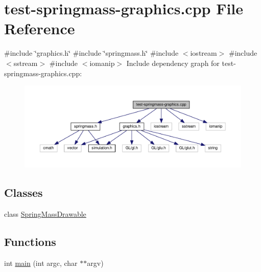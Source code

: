 \hypertarget{test-springmass-graphics_8cpp}{}\section{test-\/springmass-\/graphics.cpp File Reference}
\label{test-springmass-graphics_8cpp}
{\ttfamily \#include \char`\"{}graphics.\+h\char`\"{}}\newline
{\ttfamily \#include \char`\"{}springmass.\+h\char`\"{}}\newline
{\ttfamily \#include $<$iostream$>$}\newline
{\ttfamily \#include $<$sstream$>$}\newline
{\ttfamily \#include $<$iomanip$>$}\newline
Include dependency graph for test-\/springmass-\/graphics.cpp\+:
\nopagebreak
\begin{figure}[H]
\begin{center}
\leavevmode
\includegraphics[width=350pt]{test-springmass-graphics_8cpp__incl}
\end{center}
\end{figure}
\subsection*{Classes}
\begin{DoxyCompactItemize}
\item 
class \hyperlink{classSpringMassDrawable}{Spring\+Mass\+Drawable}
\end{DoxyCompactItemize}
\subsection*{Functions}
\begin{DoxyCompactItemize}
\item 
int \hyperlink{test-springmass-graphics_8cpp_a3c04138a5bfe5d72780bb7e82a18e627}{main} (int argc, char $\ast$$\ast$argv)
\end{DoxyCompactItemize}


